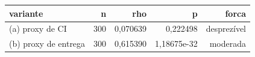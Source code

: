 \begin{tabular}{lrrrr}
\hline
variante & n & rho & p & forca \\
\hline
(a) proxy de CI & 300 & 0,070639 & 0,222498 & desprezível \\
(b) proxy de entrega & 300 & 0,615390 & 1,18675e-32 & moderada \\
\hline
\end{tabular}
